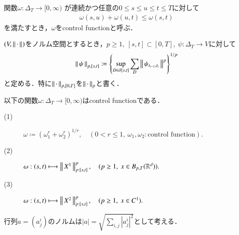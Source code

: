 	\begin{screen}
		\begin{dfn}
			関数$\omega:\Delta_T \longrightarrow [0,\infty)$
			が連続かつ任意の$0 \leq s \leq u \leq t \leq T$に対して
			\begin{align}
				\omega(s,u) + \omega(u,t) \leq \omega(s,t)
				\label{eq:control_function_subadditivity}
			\end{align}
			を満たすとき，$\omega$をcontrol functionと呼ぶ．
		\end{dfn}
	\end{screen}
	
	\begin{screen}
		\begin{dfn}
			$(V,\left\|\, \cdot\, \right\|_{})$をノルム空間とするとき，$p \geq 1,\ [s,t] \subset [0,T]
			,\ \psi:\Delta_T \longrightarrow V$に対して
			\begin{align}
				\left\|\, \psi\, \right\|_{p,[s,t]}
				\coloneqq \left\{ \operatorname*{sup}_{D \in \delta[s,t]}  \sum_D \left\|\, \psi_{t_{i-1},t_i}\, \right\|_{}^p \right\}^{1/p}
			\end{align}
			と定める．特に$\left\|\, \cdot\, \right\|_{p,[0,T]}$を$\left\|\, \cdot\, \right\|_{p}$と書く．
		\end{dfn}
	\end{screen}
	
	\begin{screen}
		\begin{thm}\label{thm:examples_of_control_functions}
			以下の関数$\omega:\Delta_T \longrightarrow [0,\infty)$はcontrol functionである．
			\begin{description}
				\item[(1)] $\omega \coloneqq \left( \omega_1^r + \omega_2^r \right)^{1/r},
					\quad (0 < r \leq 1,\ \omega_1,\omega_2:\mbox{control function}).$
				\item[(2)] $\omega:(s,t) \longmapsto \left\|\, X^1\, \right\|_{p:[s,t]}^p,
					\quad (p \geq 1,\ x \in B_{p,T}(\mathbb{R}^d)).$
				\item[(3)] $\omega:(s,t) \longmapsto \left\|\, X^2\, \right\|_{p:[s,t]}^p,
					\quad (p \geq 1,\ x \in C^1).$
			\end{description}
		\end{thm}
	\end{screen}
	
	行列$a = (a_j^i)$のノルムは$|a| = \sqrt{\sum_{i,j}|a_j^i|^2}$として考える．
	
